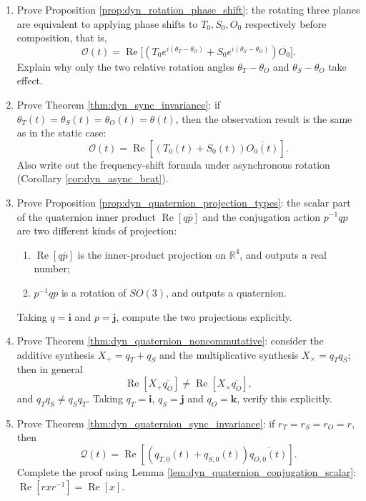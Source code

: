 \begin{enumerate}[leftmargin=3em, label=\textbf{Exercise \arabic*}]
    \item Prove Proposition \ref{prop:dyn_rotation_phase_shift}:
    the rotating three planes are equivalent to applying phase shifts to $T_0,S_0,O_0$ respectively before composition,
    that is,
    \[
    \mathcal{O}(t)=\operatorname{Re}\big[(T_0e^{i(\theta_T-\theta_O)}
    +S_0e^{i(\theta_S-\theta_O)})\overline{O_0}\big].
    \]
    Explain why only the two relative rotation angles $\theta_T-\theta_O$ and $\theta_S-\theta_O$ take effect.

    \item Prove Theorem \ref{thm:dyn_sync_invariance}:
    if $\theta_T(t)=\theta_S(t)=\theta_O(t)=\theta(t)$,
    then the observation result is the same as in the static case:
    \[
    \mathcal{O}(t)=\operatorname{Re}[(T_0(t)+S_0(t))\overline{O_0(t)}].
    \]
    Also write out the frequency-shift formula under asynchronous rotation (Corollary \ref{cor:dyn_async_beat}).

    \item Prove Proposition \ref{prop:dyn_quaternion_projection_types}:
    the scalar part of the quaternion inner product $\operatorname{Re}[q\overline{p}]$
    and the conjugation action $p^{-1}qp$ are two different kinds of projection:
    \begin{enumerate}[label=(\roman*)]
        \item $\operatorname{Re}[q\overline{p}]$ is the inner-product projection on $\mathbb{R}^4$, and outputs a real number;
        \item $p^{-1}qp$ is a rotation of $SO(3)$, and outputs a quaternion.
    \end{enumerate}
    Taking $q=\mathbf{i}$ and $p=\mathbf{j}$, compute the two projections explicitly.

    \item Prove Theorem \ref{thm:dyn_quaternion_noncommutative}:
    consider the additive synthesis $X_+=q_T+q_S$ and the multiplicative synthesis $X_\times=q_Tq_S$;
    then in general
    \[
    \operatorname{Re}[X_+\overline{q_O}]\neq\operatorname{Re}[X_\times\overline{q_O}],
    \]
    and $q_Tq_S\neq q_Sq_T$.
    Taking $q_T=\mathbf{i}$, $q_S=\mathbf{j}$ and $q_O=\mathbf{k}$, verify this explicitly.

    \item Prove Theorem \ref{thm:dyn_quaternion_sync_invariance}:
    if $r_T=r_S=r_O=r$, then
    \[
    \mathcal{Q}(t)=\operatorname{Re}[(q_{T,0}(t)+q_{S,0}(t))\overline{q_{O,0}(t)}].
    \]
    Complete the proof using Lemma \ref{lem:dyn_quaternion_conjugation_scalar}:
    $\operatorname{Re}[rxr^{-1}]=\operatorname{Re}[x]$.


\end{enumerate}
